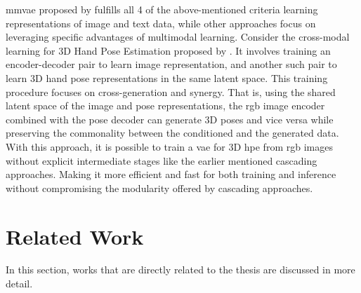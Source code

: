 \ac{mmvae} proposed by \cite{MMVAE} fulfills all 4 of the above-mentioned
criteria learning representations of image and text data, while other
approaches focus on leveraging specific advantages of multimodal learning.
Consider the cross-modal learning for 3D Hand Pose Estimation proposed by
\cite{crossmodal}. It involves training an encoder-decoder pair to learn
image representation, and another such pair to learn 3D hand pose
representations in the same latent space. This training procedure focuses
on cross-generation and synergy. That is, using the shared latent space of
the image and pose representations, the \ac{rgb} image encoder combined
with the pose decoder can generate 3D poses and vice versa while preserving
the commonality between the conditioned and the generated data. With this
approach, it is possible to train a \ac{vae} for 3D \ac{hpe} from \ac{rgb}
images without explicit intermediate stages like the earlier mentioned
cascading approaches. Making it more efficient and fast for both training
and inference without compromising the modularity offered by cascading
approaches.

\section{Related Work}
\label{section:Related Work}

In this section, works that are directly related to the thesis are discussed in more detail.



